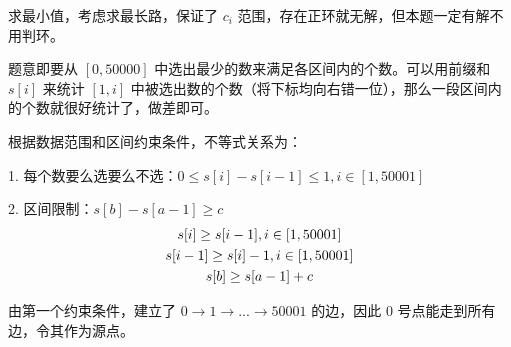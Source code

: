 求最小值，考虑求最长路，保证了 $c_i$ 范围，存在正环就无解，但本题一定有解不用判环。

题意即要从 $[0, 50000]$ 中选出最少的数来满足各区间内的个数。可以用前缀和 $s[i]$ 来统计 $[1,i]$ 中被选出数的个数（将下标均向右错一位），那么一段区间内的个数就很好统计了，做差即可。

根据数据范围和区间约束条件，不等式关系为：

1. 每个数要么选要么不选：$0 \le s[i] - s[i-1] \le 1, i \in [1,50001]$

2. 区间限制：$s[b] - s[a - 1] \ge c$
\begin{gather}
    s[i] \ge s[i-1], i \in [1,50001] \notag \\
    s[i-1] \ge s[i] - 1, i \in [1,50001] \notag \\
    s[b] \ge s[a-1] + c \notag
\end{gather}

由第一个约束条件，建立了 $0→1→...→50001$ 的边，因此 $0$ 号点能走到所有边，令其作为源点。